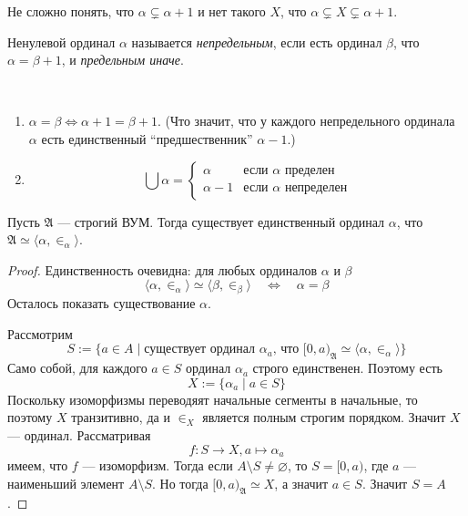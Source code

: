 \documentclass[12pt,a4paper]{article}
\begin{document}
    \begin{remark}
        Не сложно понять, что $\alpha \subsetneq \alpha + 1$ и нет такого $X$, что $\alpha \subsetneq X \subsetneq \alpha + 1$.
    \end{remark}

    \begin{definition}
        Ненулевой ординал $\alpha$ называется \emph{непредельным}, если есть ординал $\beta$, что $\alpha = \beta + 1$, и \emph{предельным иначе}.
    \end{definition}

    \begin{statement}\ 
        \begin{enumerate}
            \item $\alpha = \beta \Leftrightarrow \alpha + 1 = \beta + 1$. (Что значит, что у каждого непредельного ординала $\alpha$ есть единственный ``предшественник'' $\alpha - 1$.)
            \item \[\bigcup \alpha = \begin{cases}
                \alpha & \text{если $\alpha$ пределен}\\
                \alpha - 1 & \text{если $\alpha$ непределен}
            \end{cases}\]
        \end{enumerate}
    \end{statement}

    \begin{theorem}
        Пусть $\mathfrak{A}$ --- строгий ВУМ. Тогда существует единственный ординал $\alpha$, что $\mathfrak{A} \simeq \langle \alpha, {\in}_\alpha \rangle$.
    \end{theorem}

    \begin{proof}
        Единственность очевидна: для любых ординалов $\alpha$ и $\beta$
        \[\langle \alpha, {\in}_\alpha \rangle \simeq \langle \beta, {\in}_\beta \rangle \quad \Longleftrightarrow \quad \alpha = \beta\]
        Осталось показать существование $\alpha$.

        Рассмотрим
        \[S := \{a \in A \mid \text{существует ординал $\alpha_a$, что $[0, a)_\mathfrak{A} \simeq \langle \alpha, {\in}_\alpha \rangle$}\}\]
        Само собой, для каждого $a \in S$ ординал $\alpha_a$ строго единственен. Поэтому есть
        \[X := \{\alpha_a \mid a \in S\}\]
        Поскольку изоморфизмы переводяят начальные сегменты в начальные, то поэтому $X$ транзитивно, да и $\in_X$ является полным строгим порядком. Значит $X$ --- ординал. Рассматривая
        \[f: S \to X, a \mapsto \alpha_a\]
        имеем, что $f$ --- изоморфизм. Тогда если $A \setminus S \neq \varnothing$, то $S = [0, a)$, где $a$ --- наименьший элемент $A \setminus S$. Но тогда $[0, a)_\mathfrak{A} \simeq X$, а значит $a \in S$. Значит $S = A$.
    \end{proof}
\end{document}

